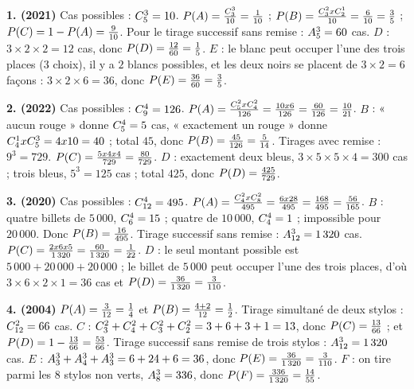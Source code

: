 \begin{corrige}[annales]
\textbf{1. (2021)} Cas possibles : $\combi{3}{5} = 10$.
$\proba{A} = \frac{\combi{3}{3}}{10} = \frac{1}{10}$ ;
$\proba{B} = \frac{\combi{2}{3}\times\combi{1}{2}}{10} = \frac{6}{10}
= \frac35$ ;
$\proba{C} = 1-\proba{A} = \frac{9}{10}$.
Pour le tirage successif sans remise : $\arrang{3}{5} = 60$ cas.
$D$ : $3\times2\times2 = 12$ cas, donc $\proba{D} = \frac{12}{60}
= \frac15$.
$E$ : le blanc peut occuper l'une des trois places ($3$ choix), il y a $2$
blancs possibles, et les deux noirs se placent de $3\times2 = 6$ façons :
$3\times2\times6 = 36$, donc $\proba{E} = \frac{36}{60} = \frac35$.

\textbf{2. (2022)} Cas possibles : $\combi{4}{9} = 126$.
$\proba{A} = \frac{\combi{2}{5}\times\combi{2}{4}}{126}
= \frac{10\times6}{126} = \frac{60}{126} = \frac{10}{21}$.
$B$ : « aucun rouge » donne $\combi{4}{5} = 5$ cas, « exactement un rouge »
donne $\combi{1}{4}\times\combi{3}{5} = 4\times10 = 40$ ; total $45$, donc
$\proba{B} = \frac{45}{126} = \frac{5}{14}$.
Tirages avec remise : $9^{3} = 729$.
$\proba{C} = \frac{5\times4\times4}{729} = \frac{80}{729}$.
$D$ : exactement deux bleus, $3\times5\times5\times4 = 300$ cas ; trois
bleus, $5^{3} = 125$ cas ; total $425$, donc
$\proba{D} = \frac{425}{729}$.

\textbf{3. (2020)} Cas possibles : $\combi{4}{12} = 495$.
$\proba{A} = \frac{\combi{2}{4}\times\combi{2}{8}}{495}
= \frac{6\times28}{495} = \frac{168}{495} = \frac{56}{165}$.
$B$ : quatre billets de $5\,000$, $\combi{4}{6} = 15$ ; quatre de
$10\,000$, $\combi{4}{4} = 1$ ; impossible pour $20\,000$. Donc
$\proba{B} = \frac{16}{495}$.
Tirage successif sans remise : $\arrang{3}{12} = 1\,320$ cas.
$\proba{C} = \frac{2\times6\times5}{1\,320} = \frac{60}{1\,320}
= \frac{1}{22}$.
$D$ : le seul montant possible est $5\,000+20\,000+20\,000$ ; le billet de
$5\,000$ peut occuper l'une des trois places, d'où
$3\times6\times2\times1 = 36$ cas et
$\proba{D} = \frac{36}{1\,320} = \frac{3}{110}$.

\textbf{4. (2004)} $\proba{A} = \frac{3}{12} = \frac14$ et
$\proba{B} = \frac{4+2}{12} = \frac12$.
Tirage simultané de deux stylos : $\combi{2}{12} = 66$ cas.
$C$ : $\combi{2}{3}+\combi{2}{4}+\combi{2}{3}+\combi{2}{2}
= 3+6+3+1 = 13$, donc $\proba{C} = \frac{13}{66}$ ; et
$\proba{D} = 1-\frac{13}{66} = \frac{53}{66}$.
Tirage successif sans remise de trois stylos :
$\arrang{3}{12} = 1\,320$ cas.
$E$ : $\arrang{3}{3}+\arrang{3}{4}+\arrang{3}{3} = 6+24+6 = 36$, donc
$\proba{E} = \frac{36}{1\,320} = \frac{3}{110}$.
$F$ : on tire parmi les $8$ stylos non verts, $\arrang{3}{8} = 336$, donc
$\proba{F} = \frac{336}{1\,320} = \frac{14}{55}$.


\end{corrige}
